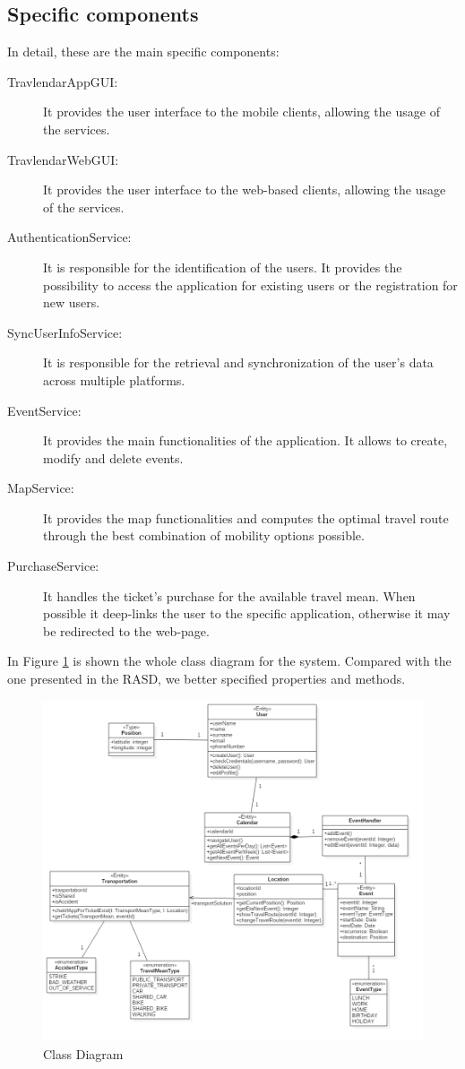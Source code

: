 \subsection*{Specific components}
In detail, these are the main specific components:
\begin{description}
\item[TravlendarAppGUI:] It provides the user interface to the mobile clients, allowing the usage of the services.
\item[TravlendarWebGUI:] It provides the user interface to the web-based clients, allowing the usage of the services.
\item[AuthenticationService:] It is responsible for the identification of the users. It provides the possibility to access the application for existing users or the registration for new users.
\item[SyncUserInfoService:] It is responsible for the retrieval and synchronization of the user's data across multiple platforms.
\item[EventService:] It provides the main functionalities of the application. It allows to create, modify and delete events.
\item[MapService:] It provides the map functionalities and computes the optimal travel route through the best combination of mobility options possible.
\item[PurchaseService:] It handles the ticket's purchase for the available travel mean. When possible it deep-links the user to the specific application, otherwise it may be redirected to the web-page.
\end{description}

In Figure \ref{fig:class_diag} is shown the whole class diagram for the system. Compared with the one presented in the RASD, we better specified properties and methods.

\begin{figure}[H]
	\centering
	\includegraphics[width=6in]{./diagrams/ClassDiagram.png}
	\caption{Class Diagram}
	\label{fig:class_diag}
\end{figure}

